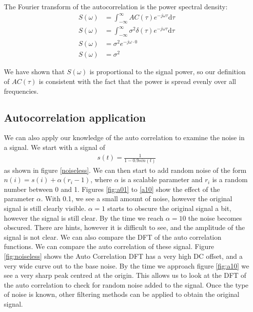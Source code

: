 \documentclass[twocolumn]{myarticle}
\renewcommand{\d}{\mathrm{d}}
\begin{document}
The Fourier transform of the autocorrelation is the power spectral density:
\begin{align}
    S(\omega) &= \int_{-\infty}^{\infty} AC(\tau) e^{-j\omega \tau} \d \tau
    \\
    S(\omega) &= \int_{-\infty}^{\infty} \sigma^2 \delta(\tau) e^{-j\omega \tau} \d \tau
    \\
    S(\omega) &= \sigma^2 e^{-j \omega \cdot 0}
    \\
    S(\omega) &= \sigma^2 
\end{align}

We have shown that $ S(\omega) $ is proportional to the signal power, so our definition of $ AC(\tau) $ is consistent with the fact that the power is spread evenly over all frequencies.

\subsection{Autocorrelation application}
\label{subsec:autocorrelation_application}

We can also apply our knowledge of the auto correlation to examine the noise in a signal. 
We start with a signal of 
\begin{align}
    s(t) = \frac{1}{1-0.9sin(t)}
\end{align}
as shown in figure \ref{noiseless}. 
We can then start to add random noise of the form $n(i) = s(i) + \alpha (r_{i} -1)$, where $\alpha$ is a scalable parameter and $r_{i}$ is a random number between 0 and 1. 
Figures \ref{fig:a01} to \ref{a10} show the effect of the parameter $\alpha$. 
With 0.1, we see a small amount of noise, however the original signal is still clearly visible. 
$\alpha = 1$ starts to obscure the original signal a bit, however the signal is still clear. 
By the time we reach $\alpha = 10$ the noise becomes obscured. 
There are hints, however it is difficult to see, and the amplitude of the signal is not clear. 
We can also compare the DFT of the auto correlation functions. 
We can compare the auto correlation of these signal. 
Figure \ref{fig:noiseless} shows the Auto Correlation DFT has a very high DC offset, and a very wide curve out to the base noise. 
By the time we approach figure \ref{fig:a10} we see a very sharp peak centred at the origin. 
This allows us to look at the DFT of the auto correlation to check for random noise added to the signal. 
Once the type of noise is known, other filtering methods can be applied to obtain the original signal.
\end{document}
